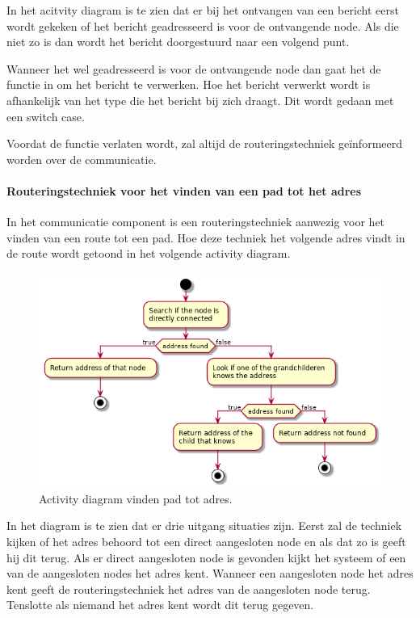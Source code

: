 \documentclass[a4paper, 11pt, oneside]{report}
\begin{document}
In het acitvity diagram is te zien dat er bij het ontvangen van een bericht eerst wordt gekeken of het bericht geadresseerd is voor de ontvangende node.
Als die niet zo is dan wordt het bericht doorgestuurd naar een volgend punt.

Wanneer het wel geadresseerd is voor de ontvangende node dan gaat het de functie in om het bericht te verwerken. Hoe het bericht verwerkt wordt is afhankelijk van het type die het bericht bij zich draagt. Dit wordt gedaan met een switch case. 

Voordat de functie verlaten wordt, zal altijd de routeringstechniek geïnformeerd worden over de communicatie.

\paragraph{Routeringstechniek voor het vinden van een pad tot het adres}
\label{DetailedDesign:Communicatie:Activity:routeringtechniek:aanvraag}
In het communicatie component is een routeringstechniek aanwezig voor het vinden van een route tot een pad. Hoe deze techniek het volgende adres vindt in de route wordt getoond in het volgende activity diagram. 

\begin{figure}[H]
	\begin{center}\includegraphics[width=.45\linewidth]{UML/out/Communication/activity/padtotadres/padtotadres.png}\end{center}
	\caption{Activity diagram vinden pad tot adres.}
	\label{fig:communication:routeringtechniek:aanvraag}
\end{figure}

In het diagram is te zien dat er drie uitgang situaties zijn. 
Eerst zal de techniek kijken of het adres behoord tot een direct aangesloten node en als dat zo is geeft hij dit terug.
Als er direct aangesloten node is gevonden kijkt het systeem of een van de aangesloten nodes het adres kent.
Wanneer een aangesloten node het adres kent geeft de routeringstechniek het adres van de aangesloten node terug.
Tenslotte als niemand het adres kent wordt dit terug gegeven.
\end{document}
